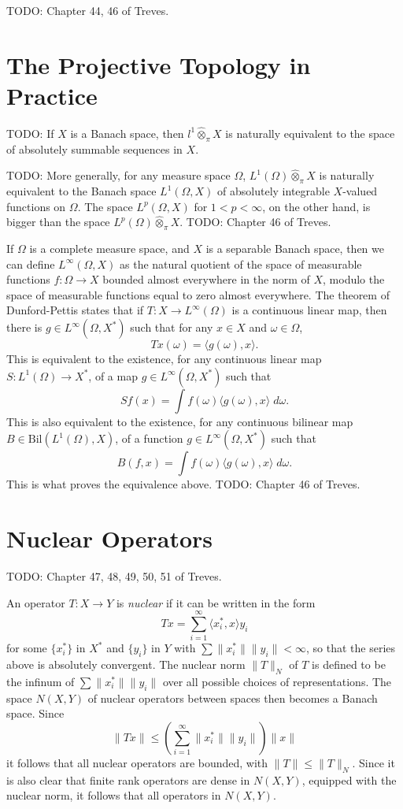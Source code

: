  TODO: Chapter 44, 46 of Treves.

 \section{The Projective Topology in Practice}

 TODO: If $X$ is a Banach space, then $l^1 \widehat{\otimes}_\pi X$ is naturally equivalent to the space of absolutely summable sequences in $X$.

 TODO: More generally, for any measure space $\Omega$, $L^1(\Omega) \widehat{\otimes}_\pi X$ is naturally equivalent to the Banach space $L^1(\Omega,X)$ of absolutely integrable $X$-valued functions on $\Omega$. The space $L^p(\Omega,X)$ for $1 < p < \infty$, on the other hand, is bigger than the space $L^p(\Omega) \widehat{\otimes}_\pi X$. TODO: Chapter 46 of Treves.

If $\Omega$ is a complete measure space, and $X$ is a separable Banach space, then we can define $L^\infty(\Omega,X)$ as the natural quotient of the space of measurable functions $f: \Omega \to X$ bounded almost everywhere in the norm of $X$, modulo the space of measurable functions equal to zero almost everywhere. The theorem of Dunford-Pettis states that if $T: X \to L^\infty(\Omega)$ is a continuous linear map, then there is $g \in L^\infty(\Omega,X^*)$ such that for any $x \in X$ and $\omega \in \Omega$,
 \[ Tx(\omega) = \langle g(\omega), x \rangle. \]
 This is equivalent to the existence, for any continuous linear map $S: L^1(\Omega) \to X^*$, of a map $g \in L^\infty(\Omega,X^*)$ such that
 \[ Sf(x) = \int f(\omega) \langle g(\omega), x \rangle\; d\omega. \]
 This is also equivalent to the existence, for any continuous bilinear map $B \in \text{Bil}(L^1(\Omega), X)$, of a function $g \in L^\infty(\Omega,X^*)$ such that
 \[ B(f,x) = \int f(\omega) \langle g(\omega), x \rangle\; d\omega. \]
 This is what proves the equivalence above. TODO: Chapter 46 of Treves.





\section{Nuclear Operators}

TODO: Chapter 47, 48, 49, 50, 51 of Treves.

An operator $T: X \to Y$ is \emph{nuclear} if it can be written in the form
%
\[ Tx = \sum_{i = 1}^\infty \langle x_i^*, x \rangle y_i \]
%
for some $\{ x_i^* \}$ in $X^*$ and $\{ y_i \}$ in $Y$ with $\sum \| x_i^* \| \| y_i \| < \infty$, so that the series above is absolutely convergent. The nuclear norm $\| T \|_N$ of $T$ is defined to be the infinum of $\sum \| x_i^* \| \| y_i \|$ over all possible choices of representations. The space $N(X,Y)$ of nuclear operators between spaces then becomes a Banach space. Since
%
\[ \| Tx \| \leq \left( \sum_{i = 1}^\infty \| x_i^* \| \| y_i \| \right) \| x \| \]
%
it follows that all nuclear operators are bounded, with $\| T \| \leq \| T \|_N$. Since it is also clear that finite rank operators are dense in $N(X,Y)$, equipped with the nuclear norm, it follows that all operators in $N(X,Y)$.

